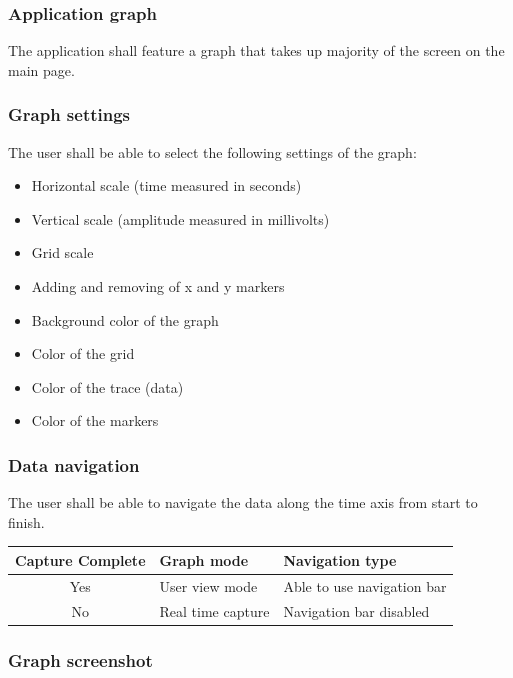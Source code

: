 \documentclass[12pt,a4paper]{article}
\begin{document}
\subsubsection{Application graph}

The application shall feature a graph that takes up majority of the screen on the main page.

\subsubsection{Graph settings}

The user shall be able to select the following settings of the graph:

\begin{itemize}
\item Horizontal scale (time measured in seconds)
\item Vertical scale (amplitude measured in millivolts)
\item Grid scale 
\item Adding and removing of x and y markers
\item Background color of the graph
\item Color of the grid
\item Color of the trace (data)
\item Color of the markers
\end{itemize}


\subsubsection{Data navigation}

The user shall be able to navigate the data along the time axis from start to finish.

\begin{table}[htbp]
	\centering
	\begin{tabular}{|c|l|l|}
		\hline
		\textbf{Capture Complete} & \textbf{Graph mode}  & \textbf{Navigation type} \\
		\hline
		Yes & User view mode & Able to use navigation bar\\
		\hline
		No & Real time capture & Navigation bar disabled \\
		\hline
	\end{tabular}
\end{table}


\subsubsection{Graph screenshot}
\end{document}
